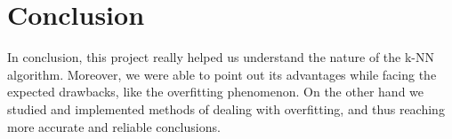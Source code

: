 \documentclass[letterpaper,11pt]{article}
\begin{document}
 \section*{Conclusion}
In conclusion, this project really helped us understand the nature of the k-NN algorithm. Moreover, we were able to point out its advantages while facing the expected drawbacks, like the overfitting phenomenon. On the other hand we studied and implemented methods of dealing with overfitting, and thus reaching more accurate and reliable conclusions.


    
\end{document}
